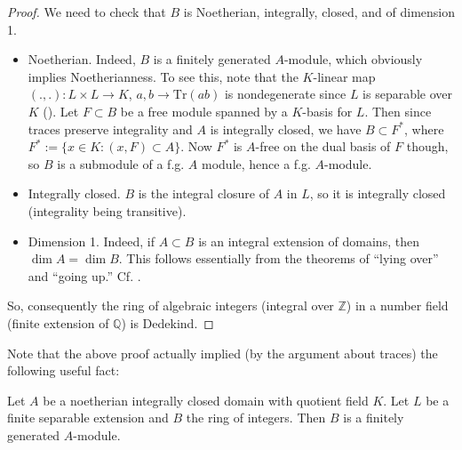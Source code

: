 \begin{proof}  We need to check that $B$ is Noetherian, integrally, closed, and of dimension 1.

\begin{itemize}
\item Noetherian.  Indeed, $B$ is a finitely generated $A$-module, which
obviously implies Noetherianness. To see this, note that the $K$-linear map
$(.,.): L \times L \to K$, $a,b \to \mathrm{Tr}(ab)$ is nondegenerate since
$L$ is separable over $K$ (\rref{}).  Let $F \subset B$ be a free module spanned by a $K$-basis for $L$.  Then since traces preserve integrality and $A$ is integrally closed, we have $B \subset F^*$, where $F^* := \{ x \in K: (x,F) \subset A \}$.  Now $F^*$ is $A$-free on the dual basis of $F$ though, so $B$ is a submodule of a f.g. $A$ module, hence a f.g. $A$-module.
\item Integrally closed.  $B$ is the integral closure of $A$ in $L$, so it
is integrally closed (integrality being transitive).
\item Dimension 1.  Indeed, if $A \subset B$ is an integral extension of
domains, then $\dim A = \dim B$. This follows essentially from the theorems of
``lying over'' and ``going up.'' Cf. \cite{Ei95}.
\end{itemize}

So, consequently the ring of algebraic integers (integral over $\mathbb{Z}$) in a number field (finite extension of $\mathbb{Q}$) is Dedekind.
\end{proof}



Note that the above proof actually implied (by the argument about traces) the following useful fact:
\begin{proposition}\label{intclosurefgen} Let $A$ be a noetherian integrally closed domain with quotient field $K$.  Let $L$ be a finite separable extension and $B$ the ring of integers. Then $B$ is a finitely generated $A$-module.
\end{proposition}


